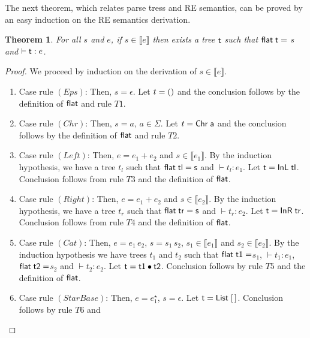 \documentclass[sigplan]{acmart}
\newtheorem{Theorem}{Theorem}
\theoremstyle{definition}
\newcommand{\sembrackets}[1]{\ensuremath{\llbracket #1 \rrbracket}}
\newcommand{\C}[1]{\red{\mathsf{#1}}}
\newcommand{\F}[1]{\green{\mathsf{#1}}}
\newcommand{\V}[1]{\black{\mathsf{#1}}}
\begin{document}
The next theorem, which relates parse tress and RE semantics,
can be proved by an easy induction on the RE semantics derivation.
\begin{Theorem}
   For all $s$ and $e$, if $s \in \sembrackets{e}$ then exists a tree \ensuremath{\V{t}}
   such that \ensuremath{\F{flat}\;\V{t}\mathrel{=}} $s$ and $\vdash \ensuremath{\V{t}} : e$.
\end{Theorem}

\begin{proof}
  We proceed by induction on the derivation of $s \in \sembrackets{e}$.
  \begin{enumerate}
    \item Case rule $(Eps)$: Then, $s = \epsilon$. Let $t = \ensuremath{\C{()}}$ and the conclusion
          follows by the definition of \ensuremath{\F{flat}} and rule $T1$.
    \item Case rule $(Chr)$: Then, $s = a$, $a \in \Sigma$. Let $t = \ensuremath{\C{Chr}\;\V{a}}$ and the conclusion
          follows by the definition of \ensuremath{\F{flat}} and rule $T2$.
    \item Case rule $(Left)$: Then, $e = e_1 + e_2$ and $s \in\sembrackets{e_1}$. By the induction hypothesis,
          we have a tree $t_l$ such that \ensuremath{\F{flat}\;\V{tl}\mathrel{=}\V{s}} and $\vdash t_l : e_1$. Let \ensuremath{\V{t}\mathrel{=}\C{InL}\;\V{tl}}.
          Conclusion follows from rule $T3$ and the definition of \ensuremath{\F{flat}}.
    \item Case rule $(Right)$: Then, $e = e_1 + e_2$ and $s \in\sembrackets{e_2}$. By the induction hypothesis,
          we have a tree $t_r$ such that \ensuremath{\F{flat}\;\V{tr}\mathrel{=}\V{s}} and $\vdash t_r : e_2$. Let \ensuremath{\V{t}\mathrel{=}\C{InR}\;\V{tr}}.
          Conclusion follows from rule $T4$ and the definition of \ensuremath{\F{flat}}.
    \item Case rule $(Cat)$: Then, $e = e_1\,e_2$, $s = s_1\,s_2$, $s_1 \in \sembrackets{e_1}$ and
          $s_2\in\sembrackets{e_2}$. By the induction hypothesis we have trees $t_1$ and $t_2$ such that
          \ensuremath{\F{flat}\;\V{t1}\mathrel{=}}$s_1$, $\vdash t_1 : e_1$, \ensuremath{\F{flat}\;\V{t2}\mathrel{=}}$s_2$ and $\vdash t_2 : e_2$. Let \ensuremath{\V{t}\mathrel{=}\V{t1}\C{\:\bullet\:}\V{t2}}.
          Conclusion follows by rule $T5$ and the definition of \ensuremath{\F{flat}}.
    \item Case rule $(StarBase)$: Then, $e = e_1^\star$, $s = \epsilon$. Let \ensuremath{\V{t}\mathrel{=}\C{List}\;[\mskip1.5mu \mskip1.5mu]}. Conclusion follows by rule $T6$ and

\end{enumerate}
\end{proof}
\end{document}
